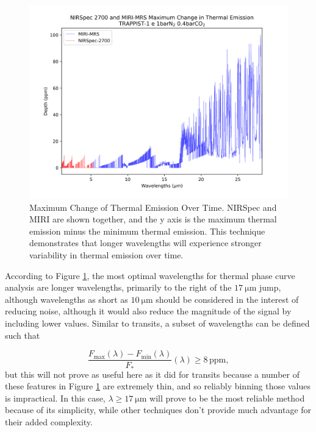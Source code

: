  \begin{figure}[ht]
    \begin{center}
        \includegraphics[width=\textwidth]{tpc/tpc_max_diff.png}
        \caption[Maximum Change of Thermal Emission Over Time]{Maximum Change of
        Thermal Emission Over Time. NIRSpec and MIRI are shown together, and
        the y axis is the maximum thermal emission minus the minimum thermal
        emission. This technique demonstrates that longer wavelengths
        will experience stronger variability in thermal emission over time.}
        \label{tpc_max_diff}
    \end{center}
\end{figure}

According to Figure \ref{tpc_max_diff}, the most optimal wavelengths for thermal
 phase curve analysis are longer wavelengths, primarily to the right of the
 $\SI{17}{\micro\meter}$ jump, although wavelengths as short as $\SI{10}{\micro\meter}$ should be considered in
 the interest of reducing noise, although it would also reduce the magnitude of
 the signal by including lower values. Similar to transits, a subset of
 wavelengths can be defined such that

\begin{equation}
    \frac{F_\mathrm{max}(\lambda)-F_\mathrm{min}(\lambda)}{F_*}(\lambda)
    \geq 8\,\mathrm{ppm},
\end{equation}
but this will not prove as useful here as it did for transits because a number
 of these features in Figure \ref{tpc_max_diff} are extremely thin, and so
 reliably binning those values is impractical. In this case,
 $\lambda\geq\SI{17}{\micro\meter}$
 will prove to be the most reliable method because of its simplicity, while other
 techniques don't provide much advantage for their added complexity.

